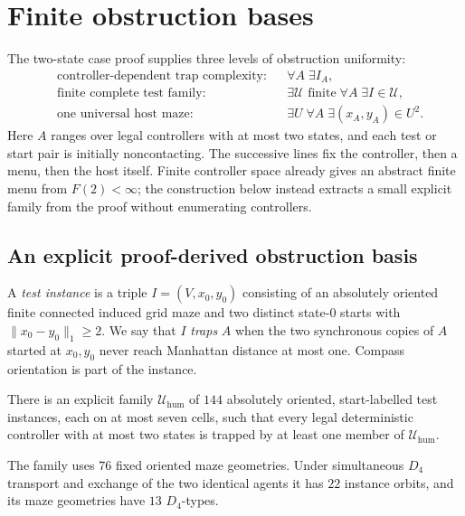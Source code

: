 \section{Finite obstruction bases}
\label{sec:finite-obstructions-universal}

The two-state case proof supplies three levels of obstruction uniformity:
\begin{equation}
\label{eq:three-obstruction-quantifiers}
\begin{aligned}
  &\text{controller-dependent trap complexity:}
  &&\forall A\;\exists I_A,\\
  &\text{finite complete test family:}
  &&\exists\mathcal U\text{ finite}\;\forall A\;\exists I\in\mathcal U,\\
  &\text{one universal host maze:}
  &&\exists U\;\forall A\;\exists(x_A,y_A)\in U^2.
\end{aligned}
\end{equation}
Here $A$ ranges over legal controllers with at most two states, and each test
or start pair is initially noncontacting. The successive lines fix the controller,
then a menu, then the host itself. Finite controller space already gives an abstract
finite menu from $F(2)<\infty$; the construction below instead extracts a small
explicit family from the proof without enumerating controllers.

\subsection{An explicit proof-derived obstruction basis}
\label{subsec:human-obstruction-basis}

A \emph{test instance} is a triple $I=(V,x_0,y_0)$ consisting of an absolutely
oriented finite connected induced grid maze and two distinct state-$0$ starts with
$\|x_0-y_0\|_1\ge2$.  We say that $I$ \emph{traps} $A$ when the two synchronous
copies of $A$ started at $x_0,y_0$ never reach Manhattan distance at most one.
Compass orientation is part of the instance.

\begin{theorem}
\label{thm:human-finite-basis}
There is an explicit family $\mathcal U_{\mathrm{hum}}$ of $144$ absolutely oriented,
start-labelled test instances, each on at most seven cells, such that every legal
deterministic controller with at most two states is trapped by at least one member of
$\mathcal U_{\mathrm{hum}}$.

The family uses $76$ fixed oriented maze geometries.  Under simultaneous $D_4$
transport and exchange of the two identical agents it has $22$ instance orbits, and
its maze geometries have $13$ $D_4$-types.
\end{theorem}

